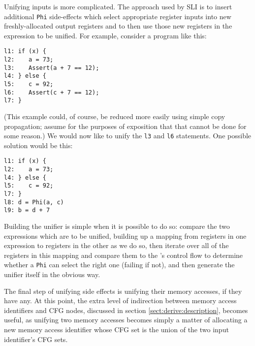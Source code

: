 Unifying inputs is more complicated.  The approach used by SLI is to
insert additional \verb|Phi| side-effects which select appropriate
register inputs into new freshly-allocated output registers and to
then use those new registers in the expression to be unified.  For
example, consider a program like this:

\begin{verbatim}
l1: if (x) {
l2:    a = 73;
l3:    Assert(a + 7 == 12);
l4: } else {
l5:    c = 92;
l6:    Assert(c + 7 == 12);
l7: }
\end{verbatim}

(This example could, of course, be reduced more easily using simple
copy propagation; assume for the purposes of exposition that that
cannot be done for some reason.)  We would now like to unify the
\verb|l3| and \verb|l6| statements.  One possible solution would be
this:

\begin{verbatim}
l1: if (x) {
l2:    a = 73;
l4: } else {
l5:    c = 92;
l7: }
l8: d = Phi(a, c)
l9: b = d + 7
\end{verbatim}

Building the unifier is simple when it is possible to do so: compare
the two expressions which are to be unified, building up a mapping
from registers in one expression to registers in the other as we do
so, then iterate over all of the registers in this mapping and compare
them to the \StateMachine's control flow to determine whether a
\verb|Phi| can select the right one (failing if not), and then
generate the unifier itself in the obvious way.



The final step of unifying side effects is unifying their memory
accesses, if they have any.  At this point, the extra level of
indirection between memory access identifiers and CFG nodes, discussed
in section \ref{sect:derive:description}, becomes useful, as unifying
two memory accesses becomes simply a matter of allocating a new memory
access identifier whose CFG set is the union of the two input
identifier's CFG sets.

